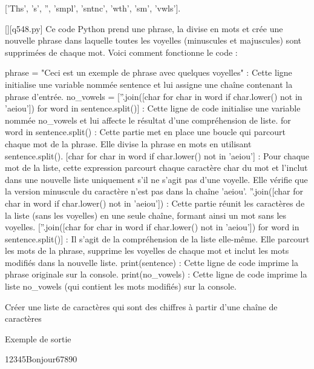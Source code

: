 ['Ths', 's', '', 'smpl', 'sntnc', 'wth', 'sm', 'vwls'].
        \par
        \begin{solution}
            \renewcommand{\nomfichier}{q548.py}
            \pythonfile{\chemincode \nomfichier}[][\nomfichier]
            Ce code Python prend une phrase, la divise en mots et crée une nouvelle phrase dans laquelle toutes les voyelles (minuscules et majuscules) sont supprimées de chaque mot. Voici comment fonctionne le code :

    phrase = "Ceci est un exemple de phrase avec quelques voyelles" : Cette ligne initialise une variable nommée sentence et lui assigne une chaîne contenant la phrase d'entrée.
    no\_vowels = [''.join([char for char in word if char.lower() not in 'aeiou']) for word in sentence.split()] : Cette ligne de code initialise une variable nommée no\_vowels et lui affecte le résultat d'une compréhension de liste.
        for word in sentence.split() : Cette partie met en place une boucle qui parcourt chaque mot de la phrase. Elle divise la phrase en mots en utilisant sentence.split().
        [char for char in word if char.lower() not in 'aeiou'] : Pour chaque mot de la liste, cette expression parcourt chaque caractère char du mot et l'inclut dans une nouvelle liste uniquement s'il ne s'agit pas d'une voyelle. Elle vérifie que la version minuscule du caractère n'est pas dans la chaîne 'aeiou'.
        ''.join([char for char in word if char.lower() not in 'aeiou']) : Cette partie réunit les caractères de la liste (sans les voyelles) en une seule chaîne, formant ainsi un mot sans les voyelles.
        [''.join([char for char in word if char.lower() not in 'aeiou']) for word in sentence.split()] : Il s'agit de la compréhension de la liste elle-même. Elle parcourt les mots de la phrase, supprime les voyelles de chaque mot et inclut les mots modifiés dans la nouvelle liste.
    print(sentence) : Cette ligne de code imprime la phrase originale sur la console.
    print(no\_vowels) : Cette ligne de code imprime la liste no\_vowels (qui contient les mots modifiés) sur la console.
        \end{solution}
        

        \question
        Créer une liste de caractères qui sont des chiffres à partir d'une chaîne de caractères

Exemple de sortie

12345Bonjour67890

